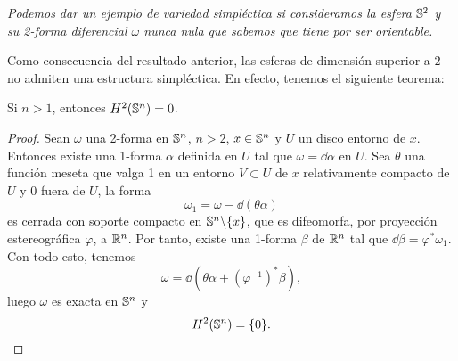 \begin{ejemplo}
  \em
  Podemos dar un ejemplo de variedad simpléctica si consideramos la esfera $\mathbb{S}^2$ y su 2-forma diferencial $\omega$ nunca nula que sabemos que tiene por ser orientable. 
\end{ejemplo}

Como consecuencia del resultado anterior, las esferas de dimensión superior a $2$ no admiten una estructura simpléctica. En efecto, tenemos el siguiente teorema:

\begin{thm}
  Si $n>1$, entonces $H^2(\mathbb{S}^n)={0}$.
\end{thm}

\begin{proof}
  Sean $\omega$ una 2-forma en $\mathbb{S}^n$, $n>2$, $x\in \mathbb{S}^n$ y $U$ un disco entorno de $x$. Entonces existe una 1-forma $\alpha$ definida en $U$ tal que $\omega=\dd \alpha$ en $U$. Sea $\theta$ una función meseta que valga 1 en un entorno $V\subset U$ de $x$ relativamente compacto de $U$ y $0$ fuera de $U$, la forma 
  \begin{equation*}
    \omega_1=\omega - \dd(\theta \alpha)
  \end{equation*}
  es cerrada con soporte compacto en $\mathbb{S}^n \backslash \{x\}$, que es difeomorfa, por proyección estereográfica $\varphi$, a $\mathbb{R}^n$. Por tanto, existe una 1-forma $\beta$ de $\mathbb{R}^n$ tal que $\dd \beta = \varphi^* \omega_1$. Con todo esto, tenemos
  \begin{equation*}
    \omega=\dd\left(\theta \alpha + \left( \varphi^{-1} \right)^* \beta \right) ,
  \end{equation*}
  luego $\omega$ es exacta en $\mathbb{S}^n$ y 
  \begin{equation*}
    H^2(\mathbb{S}^n)= \{0\}.
  \end{equation*}
\end{proof}

